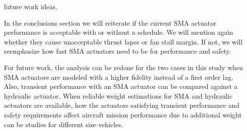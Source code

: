 future work ideas.

In the conclusions section we will reiterate if the current SMA actuator 
performance is acceptable with or without a schedule. We will mention again 
whether they cause unacceptable thrust lapse or fan stall margin. If not, we will 
reemphasize how fast SMA actuators need to be for performance and safety.

For future work, the analysis can be redone for the two cases in this study when
SMA actuators are modeled with a higher fidelity instead of a first order lag. 
Also, transient performance with an SMA actuator can be compared against a 
hydraulic actuator. When reliable weight estimations for SMA and hydraulic 
actuators are available, how the actuators satisfying transient performance and
safety requirements affect aircraft mission performance due to additional weight
can be studies for different size vehicles.